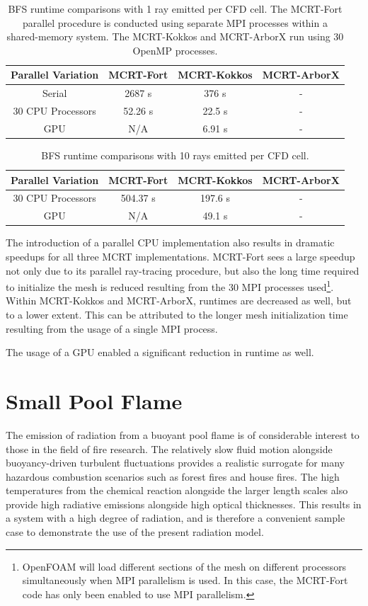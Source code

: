 \begin{table}[h!]
\centering
\begin{tabular}{||c c c c||} 
 \hline
 Parallel Variation & MCRT-Fort & MCRT-Kokkos & MCRT-ArborX \\ [0.5ex] 
 \hline\hline
 Serial & 2687 s & 376 s & - \\ 
 30 CPU Processors & 52.26 s & 22.5 s & - \\
 GPU & N/A & 6.91 s & - \\
 \hline
\end{tabular}
\caption{BFS runtime comparisons with 1 ray emitted per CFD cell. The MCRT-Fort parallel procedure is conducted using separate MPI processes within a shared-memory system. The MCRT-Kokkos and MCRT-ArborX run using 30 OpenMP processes.}
\label{table:BFS_runtime_table_1rpc}
\end{table}

\begin{table}[h!]
\centering
\begin{tabular}{||c c c c||} 
 \hline
 Parallel Variation & MCRT-Fort & MCRT-Kokkos & MCRT-ArborX \\ [0.5ex] 
 \hline\hline
 30 CPU Processors & 504.37 s & 197.6 s & - \\
 GPU & N/A & 49.1 s & - \\
 \hline
\end{tabular}
\caption{BFS runtime comparisons with 10 rays emitted per CFD cell.}
\label{table:BFS_runtime_table_10rpc}
\end{table}


The introduction of a parallel CPU implementation also results in dramatic speedups for all three MCRT implementations. MCRT-Fort sees a large speedup not only due to its parallel ray-tracing procedure, but also the long time required to initialize the mesh is reduced resulting from the 30 MPI processes used\footnote{OpenFOAM will load different sections of the mesh on different processors simultaneously when MPI parallelism is used. In this case, the MCRT-Fort code has only been enabled to use MPI parallelism.}.
Within MCRT-Kokkos and MCRT-ArborX, runtimes are decreased as well, but to a lower extent. This can be attributed to the longer mesh initialization time resulting from the usage of a single MPI process.

The usage of a GPU enabled a significant reduction in runtime as well. 


\section{Small Pool Flame}\label{section:SmallPoolFlame}
The emission of radiation from a buoyant pool flame is of considerable interest to those in the field of fire research. 
The relatively slow fluid motion alongside buoyancy-driven turbulent fluctuations provides a realistic surrogate for many hazardous combustion scenarios such as forest fires and house fires.
The high temperatures from the chemical reaction alongside the larger length scales also provide high radiative emissions alongside high optical thicknesses. 
This results in a system with a high degree of radiation, and is therefore a convenient sample case to demonstrate the use of the present radiation model.

